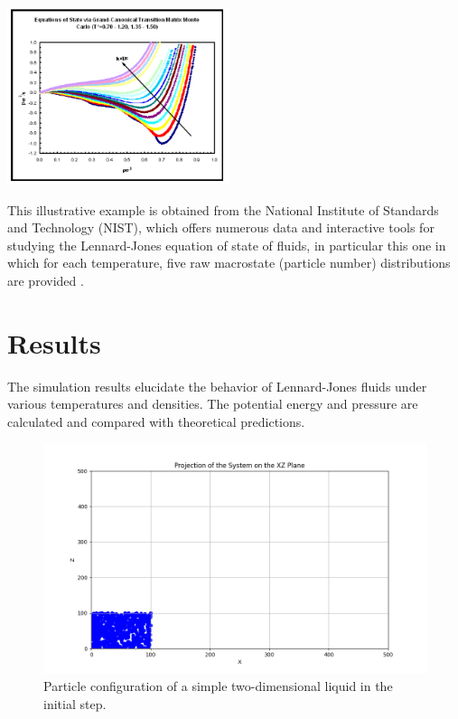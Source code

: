 \documentclass[a4paper,12pt]{article}
\begin{document}
\begin{multicols}{2}
\begin{itemize}
\begin{center}
\includegraphics[width=6.5cm]{images/17.png}
\end{center}
This illustrative example is obtained from the National Institute of Standards and Technology (NIST), which offers numerous data and interactive tools for studying the Lennard-Jones equation of state of fluids, in particular this one in which for each temperature, five raw macrostate (particle number) distributions are provided \cite{NIST_LJ_Fluid}.  

    
\end{itemize}
    
\end{multicols}

\section{Results}
The simulation results elucidate the behavior of Lennard-Jones fluids under various temperatures and densities. The potential energy and pressure are calculated and compared with theoretical predictions.

\begin{figure}[H]
    \centering
    \includegraphics[width=13cm]{images/02.png}
    \caption{Particle configuration of a simple two-dimensional liquid in the initial step.}
    \label{fig:initial}
\end{figure}
\end{document}
